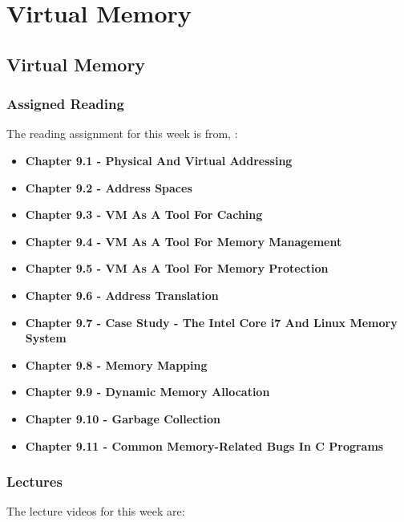 \clearpage

\renewcommand{\ChapTitle}{Virtual Memory}
\renewcommand{\SectionTitle}{Virtual Memory}

\chapter{\ChapTitle}

\section{\SectionTitle}

\subsection{Assigned Reading}

The reading assignment for this week is from, \Textbook:

\begin{itemize}
    \item \textbf{Chapter 9.1 - Physical And Virtual Addressing}
    \item \textbf{Chapter 9.2 - Address Spaces}
    \item \textbf{Chapter 9.3 - VM As A Tool For Caching}
    \item \textbf{Chapter 9.4 - VM As A Tool For Memory Management}
    \item \textbf{Chapter 9.5 - VM As A Tool For Memory Protection}
    \item \textbf{Chapter 9.6 - Address Translation}
    \item \textbf{Chapter 9.7 - Case Study - The Intel Core i7 And Linux Memory System}
    \item \textbf{Chapter 9.8 - Memory Mapping}
    \item \textbf{Chapter 9.9 - Dynamic Memory Allocation}
    \item \textbf{Chapter 9.10 - Garbage Collection}
    \item \textbf{Chapter 9.11 - Common Memory-Related Bugs In C Programs}
\end{itemize}

\subsection{Lectures}

The lecture videos for this week are:

